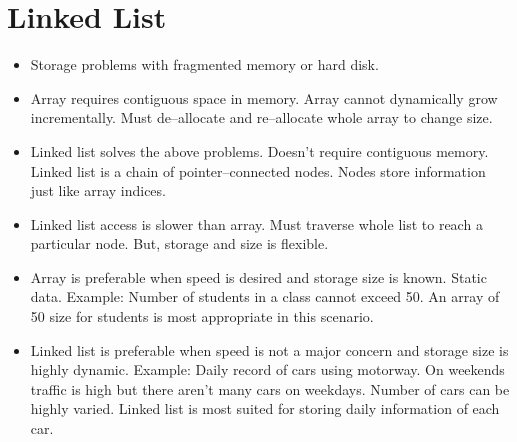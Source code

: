 \documentclass[12pt,a4paper]{article}
\begin{document}
\section{Linked List}
\begin{itemize}
\item Storage problems with fragmented memory or hard disk.
\item Array requires contiguous space in memory. Array cannot dynamically grow incrementally. Must de--allocate and re--allocate whole array to change size.
\item Linked list solves the above problems. Doesn't require contiguous memory. Linked list is a chain of pointer--connected nodes. Nodes store information just like array indices.
\item Linked list access is slower than array. Must traverse whole list to reach a particular node. But, storage and size is flexible.
\item Array is preferable when speed is desired and storage size is known. Static data. Example: Number of students in a class cannot exceed 50. An array of 50 size for students is most appropriate in this scenario.
\item Linked list is preferable when speed is not a major concern and storage size is highly dynamic. Example: Daily record of cars using motorway. On weekends traffic is high but there aren't many cars on weekdays. Number of cars can be highly varied. Linked list is most suited for storing daily information of each car.
\end{itemize}
%
%
\end{document}
